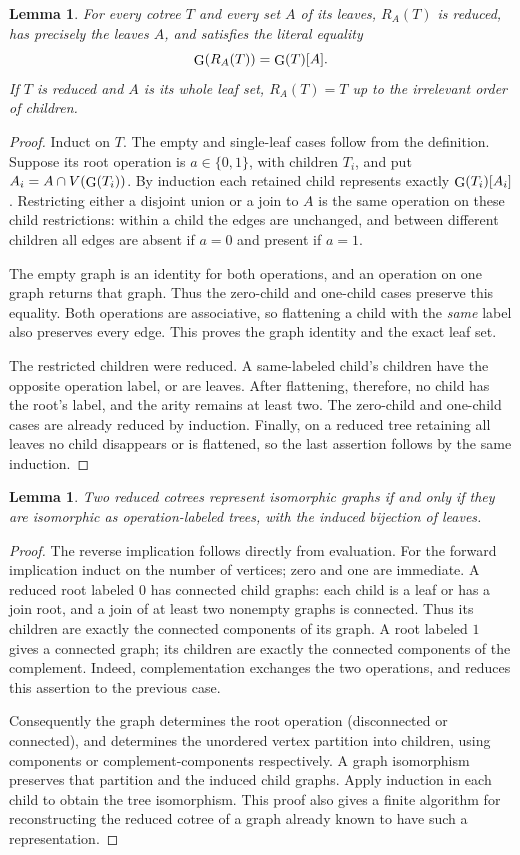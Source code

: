 \documentclass[11pt]{article}
\newtheorem{lemma}[theorem]{Lemma}
\newcommand{\ev}{\mathop{\rm G}}
\begin{document}
\begin{lemma}\label{lem:restriction}
For every cotree $T$ and every set $A$ of its leaves, $R_A(T)$ is reduced,
has precisely the leaves $A$, and satisfies the literal equality
\[
             \ev(R_A(T))=\ev(T)[A].
\]
If $T$ is reduced and $A$ is its whole leaf set, $R_A(T)=T$ up to the
irrelevant order of children.
\end{lemma}
\begin{proof}
Induct on $T$. The empty and single-leaf cases follow from the definition.
Suppose its root operation is $a\in\{0,1\}$, with children $T_i$, and put
$A_i=A\cap V(\ev(T_i))$. By induction each retained child represents exactly
$\ev(T_i)[A_i]$. Restricting either a disjoint union or a join to $A$ is
the same operation on these child restrictions: within a child the edges are
unchanged, and between different children all edges are absent if $a=0$
and present if $a=1$.

The empty graph is an identity for both operations, and an operation on one
graph returns that graph. Thus the zero-child and one-child cases preserve
this equality. Both operations are associative, so flattening a child with
the \emph{same} label also preserves every edge. This proves the graph
identity and the exact leaf set.

The restricted children were reduced. A same-labeled child's children have
the opposite operation label, or are leaves. After flattening, therefore,
no child has the root's label, and the arity remains at least two. The
zero-child and one-child cases are already reduced by induction. Finally,
on a reduced tree retaining all leaves no child disappears or is flattened,
so the last assertion follows by the same induction.
\end{proof}

\begin{lemma}\label{lem:unique}
Two reduced cotrees represent isomorphic graphs if and only if they are
isomorphic as operation-labeled trees, with the induced bijection of leaves.
\end{lemma}
\begin{proof}
The reverse implication follows directly from evaluation. For the forward
implication induct on the number of vertices; zero and one are immediate.
A reduced root labeled $0$ has connected child graphs: each child is a leaf
or has a join root, and a join of at least two nonempty graphs is connected.
Thus its children are exactly the connected components of its graph.
A root labeled $1$ gives a connected graph; its children are exactly the
connected components of the complement. Indeed, complementation exchanges
the two operations, and reduces this assertion to the previous case.

Consequently the graph determines the root operation (disconnected or
connected), and determines the unordered vertex partition into children,
using components or complement-components respectively. A graph isomorphism
preserves that partition and the induced child graphs. Apply induction in
each child to obtain the tree isomorphism. This proof also gives a finite
algorithm for reconstructing the reduced cotree of a graph already known
to have such a representation.
\end{proof}
\end{document}
